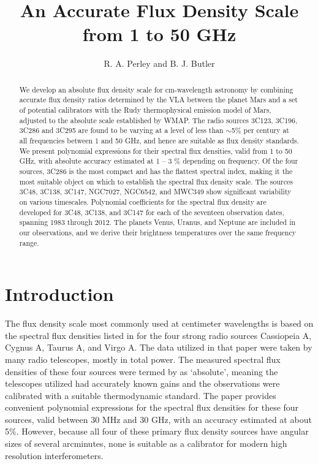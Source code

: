 \documentclass{aastex}
\begin{document}
\title{An Accurate Flux Density Scale from 1 to 50 GHz}
\author{R. A. Perley and B. J. Butler}

\begin{abstract}
We develop an absolute flux density scale for cm-wavelength astronomy
by combining accurate flux density ratios determined by the VLA
between the planet Mars and a set of potential calibrators with the
Rudy thermophysical emission model of Mars, adjusted to the absolute
scale established by WMAP.  The radio sources 3C123, 3C196, 3C286 and
3C295 are found to be varying at a level of less than $\sim$5\% per
century at all frequencies between 1 and 50 GHz, and hence are
suitable as flux density standards.  We present polynomial expressions
for their spectral flux densities, valid from 1 to 50 GHz, with
absolute accuracy estimated at 1 -- 3 \% depending on frequency. Of
the four sources, 3C286 is the most compact and has the flattest
spectral index, making it the most suitable object on which to
establish the spectral flux density scale.  The sources 3C48, 3C138,
3C147, NGC7027, NGC6542, and MWC349 show significant variability on
various timescales.  Polynomial coefficients for the spectral flux
density are developed for 3C48, 3C138, and 3C147 for each of the
seventeen observation dates, spanning 1983 through 2012.  The planets
Venus, Uranus, and Neptune are included in our observations, and we
derive their brightness temperatures over the same frequency range.
\end{abstract}


\maketitle

\section{Introduction}

The flux density scale most commonly used at centimeter wavelengths is
based on the spectral flux densities listed in \citet{Baa77} for the four
strong radio sources Cassiopeia A, Cygnus A, Taurus A, and Virgo A.
The data utilized in that paper were taken by many radio telescopes,
mostly in total power.  The measured spectral flux densities of these
four sources were termed by \citet{Baa77} as `absolute', meaning the
telescopes utilized had accurately known gains and the observations
were calibrated with a suitable thermodynamic standard. The
\citet{Baa77} paper provides convenient polynomial expressions for the
spectral flux densities for these four sources, valid between 30 MHz
and 30 GHz, with an accuracy estimated at about
5\%. However, because all four of these primary flux density sources
have angular sizes of several arcminutes, none is suitable as a
calibrator for modern high resolution interferometers.   
\end{document}
